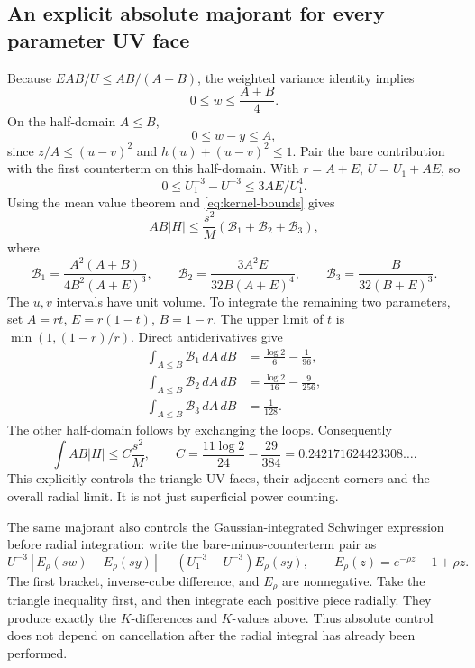 \subsection{An explicit absolute majorant for every parameter UV face}
Because \(EAB/U\leq AB/(A+B)\), the weighted variance identity implies
\[
 0\leq w\leq\frac{A+B}{4}.
\]
On the half-domain \(A\leq B\),
\[
 0\leq w-y\leq A,
\]
since \(z/A\leq(u-v)^2\) and \(h(u)+(u-v)^2\leq1\).
Pair the bare contribution with the first counterterm on this half-domain.
With \(r=A+E\), \(U=U_1+AE\), so
\[
 0\leq U_1^{-3}-U^{-3}\leq3AE/U_1^4.
\]
Using the mean value theorem and \eqref{eq:kernel-bounds} gives
\begin{equation}\label{eq:majorant}
 AB|H|\leq\frac{s^2}{M}(\mathcal B_1+\mathcal B_2+\mathcal B_3),
\end{equation}
where
\[
 \mathcal B_1=\frac{A^2(A+B)}{4B^2(A+E)^3},\qquad
 \mathcal B_2=\frac{3A^2E}{32B(A+E)^4},\qquad
 \mathcal B_3=\frac{B}{32(B+E)^3}.
\]
The \(u,v\) intervals have unit volume. To integrate the remaining two
parameters, set \(A=rt\), \(E=r(1-t)\), \(B=1-r\). The upper limit of
\(t\) is \(\min(1,(1-r)/r)\). Direct antiderivatives give
\begin{align}
 \int_{A\leq B}\mathcal B_1\,dA\,dB&=\frac{\log2}{6}-\frac1{96},\\
 \int_{A\leq B}\mathcal B_2\,dA\,dB&=\frac{\log2}{16}-\frac9{256},\\
 \int_{A\leq B}\mathcal B_3\,dA\,dB&=\frac1{128}.
\end{align}
The other half-domain follows by exchanging the loops. Consequently
\begin{equation}\label{eq:quadratic-bound}
 \int AB|H|\leq C\frac{s^2}{M},\qquad
 C=\frac{11\log2}{24}-\frac{29}{384}
   =0.242171624423308\ldots.
\end{equation}
This explicitly controls the triangle UV faces, their adjacent corners and
the overall radial limit. It is not just superficial power counting.

The same majorant also controls the Gaussian-integrated Schwinger expression
before radial integration: write the bare-minus-counterterm pair as
\[
 U^{-3}[E_\rho(sw)-E_\rho(sy)]
 -(U_1^{-3}-U^{-3})E_\rho(sy),\qquad
 E_\rho(z)=e^{-\rho z}-1+\rho z.
\]
The first bracket, inverse-cube difference, and \(E_\rho\) are nonnegative.
Take the triangle inequality first, and then integrate each positive piece
radially. They produce exactly the \(K\)-differences and \(K\)-values above.
Thus absolute control does not depend on cancellation after the radial
integral has already been performed.


